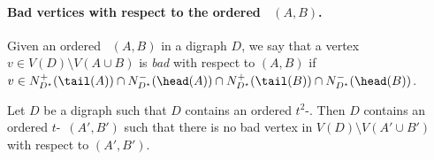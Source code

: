 \paragraph*{Bad vertices with respect to the ordered \toughpair\ $(A,B)$.}
Given an ordered \toughpair\ $(A,B)$ in a digraph $D$,
we say that a vertex $v \in V(D) \setminus V(A\cup B)$ is {\em bad} with respect to $(A,B)$ if $v \in N^+_{D^{\star}}(\tail(A)) \cap N^-_{D^{\star}}(\head(A)) \cap N^+_{D^{\star}}(\tail(B)) \cap N^-_{D^{\star}}(\head(B))$. 

\begin{lemma}\label{lem:badvertices}
Let $D$ be a
digraph such that $D$ contains an ordered $t^2$-\toughpair. Then $D$ contains an ordered $t$-\toughpair\ $(A',B')$ such that there is no bad vertex in $V(D) \setminus V(A' \cup B')$ with respect to $(A',B')$.
\end{lemma}

